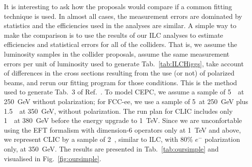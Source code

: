 It is interesting to ask how the proposals would compare if a common
fitting technique is used. In almost all cases, the measurement errors
are dominated by statistics and the efficiencies used in the analyses
are similar.  A simple way to make the comparison is  to use
the results of our ILC analyses to estimate efficiencies and
statistical errors for all of the colliders.  That is, we  assume
the luminosity samples in the collider proposals, assume the same
measurement errors per unit of luminosity used to generate
 Tab.~\ref{tab:ILCHiggs},  take account of differences in
the cross sections resulting from the use (or not) of polarized beams,
and rerun our fitting  program for those conditions.   This is the
method used to generate 
Tab.~3 of Ref.~\cite{Barklow:2017suo}.  To model CEPC, we assume
 a sample of  5~\iab\ at 250~GeV without polarization; for 
FCC-ee, we use a sample of 5~\iab at 250~GeV plus 1.5~\iab\ at 350~GeV,
without polarization.  The run plan for CLIC includes only 1~\iab\ at
380~GeV before the energy upgrade to 1~TeV.  Since we are
unconfortable using the EFT formalism
 with dimension-6 operators only at 1~TeV and above, we represent CLIC by a sample of
2~\iab, similar to ILC, with 80\% $e^-$ polarization only, at 350~GeV.  
The results are presented in Tab.~\ref{tab:oursimple} and visualised in Fig.~\ref{fig:oursimple}.  


